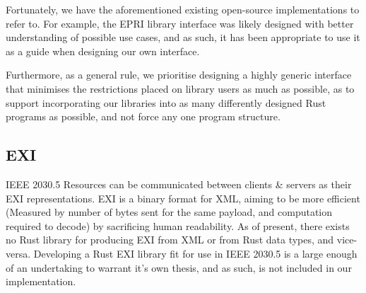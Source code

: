 Fortunately, we have the aforementioned existing open-source implementations to refer to. For example, the EPRI library interface was likely designed with better understanding of possible use cases, and as such, it has been appropriate to use it as a guide when designing our own interface.

Furthermore, as a general rule, we prioritise designing a highly generic interface that minimises the restrictions placed on library users as much as possible, as to support incorporating our libraries into as many differently designed Rust programs as possible, and not force any one program structure.

\subsection{EXI}
IEEE 2030.5 Resources can be communicated between clients \& servers as their EXI representations. EXI is a binary format for XML, aiming to be more efficient (Measured by number of bytes sent for the same payload, and computation required to decode) by sacrificing human readability. As of present, there exists no Rust library for producing EXI from XML or from Rust data types, and vice-versa.
Developing a Rust EXI library fit for use in IEEE 2030.5 is a large enough of an undertaking to warrant it's own thesis, and as such, is not included in our implementation.

